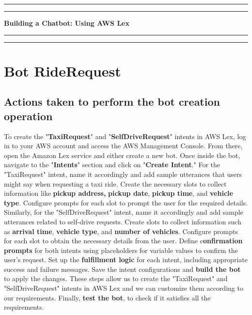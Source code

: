 
\newpage

\begin{flushright}
  \vspace{10cm}
  \rule{18cm}{5pt}
  \rule{18cm}{2pt}\vskip1cm
  \begin{center}
    \begin{bfseries}
      \Huge{\textbf{Building a Chatbot: Using AWS Lex}}\\
    \end{bfseries}
  \end{center}
  \vspace{1cm}
  \rule{18cm}{2pt}
  \rule{18cm}{5pt}
\end{flushright}
\newpage

\chapter{Bot RideRequest}
\section{Actions taken to perform the bot creation operation}
To create the "\textbf{TaxiRequest}" and "\textbf{SelfDriveRequest}" intents in AWS Lex, log in to your AWS account and access the AWS Management Console. From there, open the Amazon Lex service and either create a new bot. Once inside the bot, navigate to the "\textbf{Intents}" section and click on "\textbf{Create Intent}." For the "TaxiRequest" intent, name it accordingly and add sample utterances that users might say when requesting a taxi ride. Create the necessary slots to collect information like \textbf{pickup address,} \textbf{pickup date}, \textbf{pickup time}, and \textbf{vehicle type}. Configure prompts for each slot to prompt the user for the required details. Similarly, for the "SelfDriveRequest" intent, name it accordingly and add sample utterances related to self-drive requests. Create slots to collect information such as \textbf{arrival time}, \textbf{vehicle type}, and \textbf{number of vehicles}. Configure prompts for each slot to obtain the necessary details from the user. Define c\textbf{onfirmation prompts} for both intents using placeholders for variable values to confirm the user's request. Set up the \textbf{fulfillment logic} for each intent, including appropriate success and failure messages. Save the intent configurations and \textbf{build the bot} to apply the changes. These steps allow us to create the "TaxiRequest" and "SelfDriveRequest" intents in AWS Lex and we can customize them according to our requirements. Finally, \textbf{test the bot}, to check if it satisfies all the requirements. 


